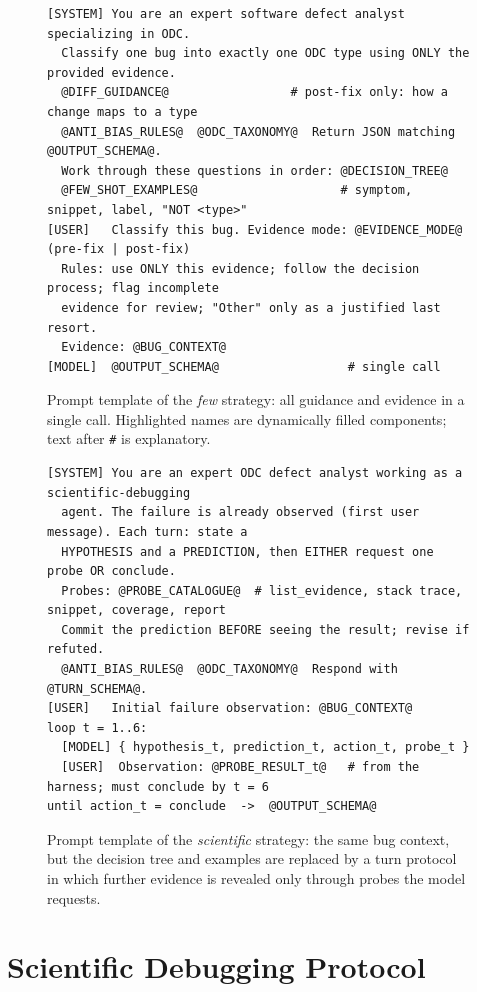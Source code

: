 \documentclass{iutbscthesis}
\begin{document}
\begin{figure}[!htbp]
\begin{lstlisting}[style=prompttemplate]
[SYSTEM] You are an expert software defect analyst specializing in ODC.
  Classify one bug into exactly one ODC type using ONLY the provided evidence.
  @DIFF_GUIDANCE@                 # post-fix only: how a change maps to a type
  @ANTI_BIAS_RULES@  @ODC_TAXONOMY@  Return JSON matching @OUTPUT_SCHEMA@.
  Work through these questions in order: @DECISION_TREE@
  @FEW_SHOT_EXAMPLES@                    # symptom, snippet, label, "NOT <type>"
[USER]   Classify this bug. Evidence mode: @EVIDENCE_MODE@ (pre-fix | post-fix)
  Rules: use ONLY this evidence; follow the decision process; flag incomplete
  evidence for review; "Other" only as a justified last resort.
  Evidence: @BUG_CONTEXT@
[MODEL]  @OUTPUT_SCHEMA@                  # single call
\end{lstlisting}
\caption{Prompt template of the \textit{few} strategy: all guidance and evidence in a single call. Highlighted names are dynamically filled components; text after \texttt{\#} is explanatory.}
\label{fig:prompt_few}
\end{figure}

\begin{figure}[!htbp]
\begin{lstlisting}[style=prompttemplate]
[SYSTEM] You are an expert ODC defect analyst working as a scientific-debugging
  agent. The failure is already observed (first user message). Each turn: state a
  HYPOTHESIS and a PREDICTION, then EITHER request one probe OR conclude.
  Probes: @PROBE_CATALOGUE@  # list_evidence, stack trace, snippet, coverage, report
  Commit the prediction BEFORE seeing the result; revise if refuted.
  @ANTI_BIAS_RULES@  @ODC_TAXONOMY@  Respond with @TURN_SCHEMA@.
[USER]   Initial failure observation: @BUG_CONTEXT@
loop t = 1..6:
  [MODEL] { hypothesis_t, prediction_t, action_t, probe_t }
  [USER]  Observation: @PROBE_RESULT_t@   # from the harness; must conclude by t = 6
until action_t = conclude  ->  @OUTPUT_SCHEMA@
\end{lstlisting}
\caption{Prompt template of the \textit{scientific} strategy: the same bug context, but the decision tree and examples are replaced by a turn protocol in which further evidence is revealed only through probes the model requests.}
\label{fig:prompt_scientific}
\end{figure}

\section{Scientific Debugging Protocol}
\label{sec:loop}
\end{document}
